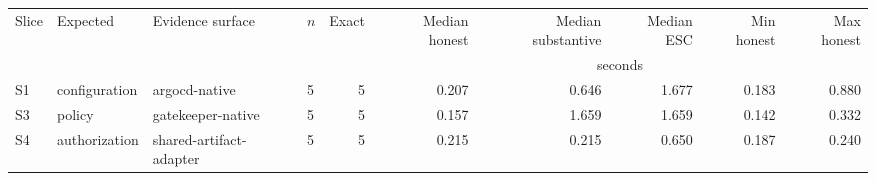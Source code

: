 \begin{tabular}{@{}llllrrrrrr@{}}
\toprule
Slice & Expected & Evidence surface & $n$ & Exact & Median honest & Median substantive & Median ESC & Min honest & Max honest \\
 & & & & & \multicolumn{5}{c}{seconds} \\
\midrule
S1 & configuration & argocd-native & 5 & 5 & 0.207 & 0.646 & 1.677 & 0.183 & 0.880 \\
S3 & policy & gatekeeper-native & 5 & 5 & 0.157 & 1.659 & 1.659 & 0.142 & 0.332 \\
S4 & authorization & shared-artifact-adapter & 5 & 5 & 0.215 & 0.215 & 0.650 & 0.187 & 0.240 \\
\bottomrule
\end{tabular}
